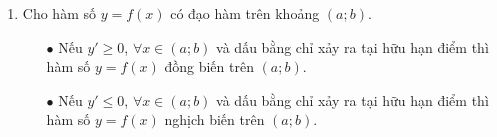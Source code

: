 \begin{enumerate}[\iconMT]
\begin{minipage}[b]{8cm}
\begin{khung4}{Ghi nhớ 2}
{}\\
	Trên $K$, đồ thị là một "\textbf{đường đi xuống}" khi xét từ trái sang phải.
\end{khung4}
\end{minipage}
	\item {}
	Cho hàm số $y=f(x)$ có đạo hàm trên khoảng $(a;b)$.
	\begin{boxdn}
	\begin{itemize}
		\item [$\bullet$] Nếu $y'\ge 0$, $\forall x \in (a;b)$ và dấu bằng chỉ xảy ra tại hữu hạn điểm thì hàm số $y=f(x)$ đồng biến trên $(a;b)$.
		\item [$\bullet$] Nếu $y'\le 0$, $\forall x \in (a;b)$ và dấu bằng chỉ xảy ra tại hữu hạn điểm thì hàm số  $y=f(x)$ nghịch biến trên $(a;b)$.
	\end{itemize}
	\end{boxdn}
\end{enumerate}
